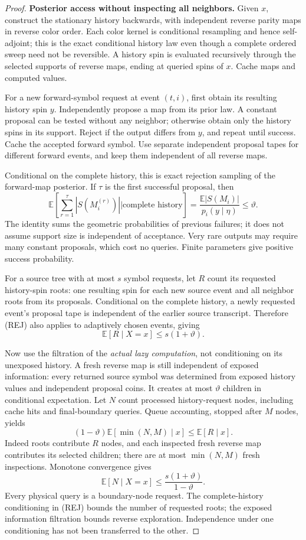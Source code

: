\begin{proof}
\textbf{Posterior access without inspecting all neighbors.}
Given \(x\), construct the stationary history backwards, with
independent reverse parity maps in reverse color order. Each color
kernel is conditional resampling and hence self-adjoint; this is the
exact conditional history law even though a complete ordered sweep
need not be reversible. A history spin is evaluated recursively through
the selected supports of reverse maps, ending at queried spins of
\(x\). Cache maps and computed values.

For a new forward-symbol request at event \((t,i)\), first obtain
its resulting history spin \(y\). Independently propose a map from
its prior law. A constant proposal can be tested without any neighbor;
otherwise obtain only the history spins in its support. Reject if the
output differs from \(y\), and repeat until success. Cache the
accepted forward symbol. Use separate independent proposal tapes for
different forward events, and keep them independent of all reverse
maps.

Conditional on the complete history, this is exact rejection sampling
of the forward-map posterior. If \(\tau\) is the first successful
proposal, then
\[
 \mathbb E\left[\sum_{r=1}^{\tau}|S(M_i^{(r)})|
       \mathrel{\Big|}\text{complete history}\right]
 =\frac{\mathbb E|S(M_i)|}{p_i(y\mid\eta)}
 \le\vartheta.                                   \tag{REJ}
\]
The identity sums the geometric probabilities of previous failures;
it does not assume support size is independent of acceptance. Very
rare outputs may require many constant proposals, which cost no
queries. Finite parameters give positive success probability.

For a source tree with at most \(s\) symbol requests, let \(R\)
count its requested history-spin roots: one resulting spin for each
new source event and all neighbor roots from its proposals. Conditional
on the complete history, a newly requested event's proposal tape is
independent of the earlier source transcript. Therefore (REJ) also
applies to adaptively chosen events, giving
\[
 \mathbb E[R\mid X=x]\le s(1+\vartheta).          \tag{ROOT}
\]

Now use the filtration of the \emph{actual lazy computation}, not
conditioning on its unexposed history. A fresh reverse map is still
independent of exposed information: every returned source symbol was
determined from exposed history values and independent proposal coins.
It creates at most \(\vartheta\) children in conditional expectation.
Let \(N\) count processed history-request nodes, including cache hits
and final-boundary queries. Queue accounting, stopped after \(M\)
nodes, yields
\[
 (1-\vartheta)\mathbb E[\min(N,M)\mid x]
 \le\mathbb E[R\mid x].
\]
Indeed roots contribute \(R\) nodes, and each inspected fresh reverse
map contributes its selected children; there are at most
\(\min(N,M)\) fresh inspections. Monotone convergence gives
\[
 \mathbb E[N\mid X=x]
 \le\frac{s(1+\vartheta)}{1-\vartheta}.           \tag{POST}
\]
Every physical query is a boundary-node request. The complete-history
conditioning in (REJ) bounds the number of requested roots; the exposed
information filtration bounds reverse exploration. Independence under
one conditioning has not been transferred to the other.


\end{proof}
